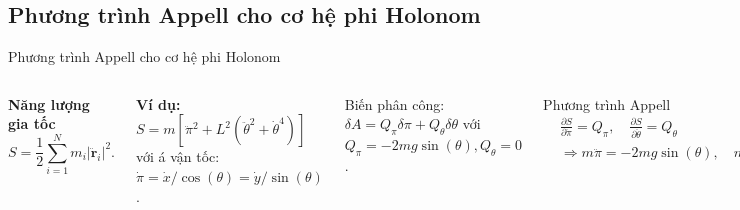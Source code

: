 \subsection{Phương trình Appell cho cơ hệ phi Holonom}

\begin{frame}{Phương trình Appell cho cơ hệ phi Holonom}

\begin{columns}
    \vspace{-3mm}
    \textbf{Năng lượng gia tốc}
    \begin{equation}
        S = \frac{1}{2} \sum_{i=1}^{N} m_i \left| \ddot{\mathbf{r}}_i \right|^2.
    \end{equation}

    \textbf{Ví dụ:} \( S = m \left[ \ddot{\pi}^2 + L^2 \left( \ddot{\theta}^2 + \dot{\theta}^4 \right) \right] \) 
    với á vận tốc: \( \dot{\pi} = \dot{x}/ \cos ( \theta ) = \dot{y}/ \sin ( \theta )\).

    Biến phân công: \(\delta A = Q_{\pi} \delta \pi + Q_{\theta} \delta \theta\)
    với \( Q_{\pi} = -2 mg \sin ( \theta ), Q_{\theta} = 0\).

    Phương trình Appell
    \vspace{-2mm}
    \begin{align}
        & \frac{\partial S}{\partial \ddot{\pi}} = Q_{\pi}, \quad \frac{\partial S}{\partial \ddot{\theta}} = Q_{\theta} \\
        & \Rightarrow m \ddot{\pi} = -2 mg \sin ( \theta ), \quad m L^2 \ddot{\theta} = 0.
    \end{align}

    \vspace{-6mm}
    \begin{figure}
        \centering
        \includegraphics[width=0.9\textwidth]{Figures/NonHolonomic_example.pdf}
        \vspace{-2mm}
        \caption{Một thanh chuyển động dưới tác dụng của trọng trường.}
    \end{figure}
\end{columns}
    
\end{frame}